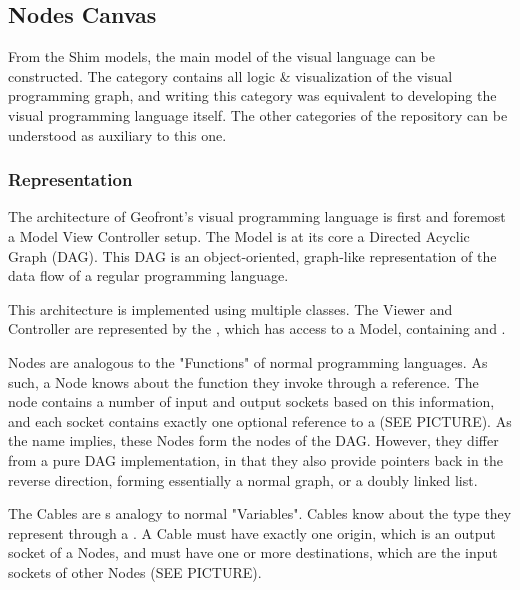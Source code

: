 \subsection{Nodes Canvas}
From the Shim models, the main model of the visual language can be constructed. 
The  category contains all logic \& visualization of the visual programming graph, and writing this category was equivalent to developing the visual programming language itself. 
The other categories of the repository can be understood as auxiliary to this one.

\subsubsection*{Representation}


The architecture of Geofront's visual programming language is first and foremost a Model View Controller setup. 
The Model is at its core a Directed Acyclic Graph (DAG). 
This DAG is an object-oriented, graph-like representation of the data flow of a regular programming language. 

This architecture is implemented using multiple classes. The Viewer and Controller are represented by the , which has access to a  Model, containing  and . 

Nodes are analogous to the "Functions" of normal programming languages. 
As such, a Node knows about the function they invoke through a  reference. 
The node contains a number of input and output sockets based on this information, and each socket contains exactly one optional reference to a  (SEE PICTURE).  
As the name implies, these Nodes form the nodes of the DAG. However, they differ from a pure DAG implementation, in that they also provide pointers back in the reverse direction, forming essentially a normal graph, or a doubly linked list. 

The Cables are \geofront{}s analogy to normal "Variables". Cables know about the type they represent through a . A Cable must have exactly one origin, which is an output socket of a Nodes, and must have one or more destinations, which are the input sockets of other Nodes (SEE PICTURE).


